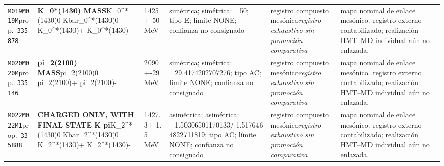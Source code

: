 \begin{landscape}
\begin{longtable}{L{1.85cm}L{4.45cm}L{2.35cm}L{4.05cm}L{3.35cm}L{7.15cm}}
\texttt{M019}\newline \texttt{M019M}\newline prop.\ \texttt{335878} & \textbf{K\_\allowbreak{}0*(1430) MASS}\newline K\_\allowbreak{}0\textasciicircum{}*(1430)0 \textbar{}\allowbreak{} Kbar\_\allowbreak{}0\textasciicircum{}*(1430)0 \textbar{}\allowbreak{} K\_\allowbreak{}0\textasciicircum{}*(1430)+ \textbar{}\allowbreak{} K\_\allowbreak{}0\textasciicircum{}*(1430)- & 1425+-50\,MeV & simétrica; simétrica: ±50; tipo E; límite NONE; confianza no consignado & registro compuesto mesónico\newline \emph{registro exhaustivo sin promoción comparativa} & mapa nominal de enlace mesónico. registro externo contabilizado; realización HMT--MD individual aún no enlazada. \\
\texttt{M020}\newline \texttt{M020M}\newline prop.\ \texttt{335146} & \textbf{pi\_\allowbreak{}2(2100) MASS}\newline pi\_\allowbreak{}2(2100)0 \textbar{}\allowbreak{} pi\_\allowbreak{}2(2100)+ \textbar{}\allowbreak{} pi\_\allowbreak{}2(2100)- & 2090+-29\,MeV & simétrica; simétrica: ±29.4174202707276; tipo AC; límite NONE; confianza no consignado & registro compuesto mesónico\newline \emph{registro exhaustivo sin promoción comparativa} & mapa nominal de enlace mesónico. registro externo contabilizado; realización HMT--MD individual aún no enlazada. \\
\texttt{M022}\newline \texttt{M022M1}\newline prop.\ \texttt{335888} & \textbf{CHARGED ONLY, WITH FINAL STATE K pi}\newline K\_\allowbreak{}2\textasciicircum{}*(1430)0 \textbar{}\allowbreak{} Kbar\_\allowbreak{}2\textasciicircum{}*(1430)0 \textbar{}\allowbreak{} K\_\allowbreak{}2\textasciicircum{}*(1430)+ \textbar{}\allowbreak{} K\_\allowbreak{}2\textasciicircum{}*(1430)- & 1427.3+-1.5\,MeV & asimétrica; asimétrica: +1.50306501170133/-1.5176464822711819; tipo AC; límite NONE; confianza no consignado & registro compuesto mesónico\newline \emph{registro exhaustivo sin promoción comparativa} & mapa nominal de enlace mesónico. registro externo contabilizado; realización HMT--MD individual aún no enlazada. \\

\end{longtable}
\end{landscape}
